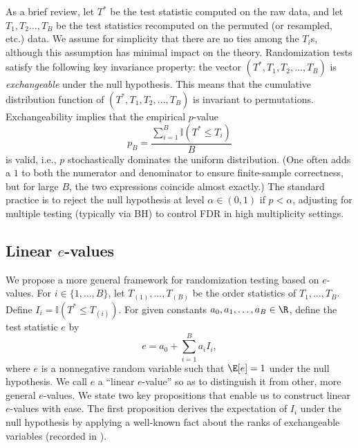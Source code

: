 \documentclass[12pt]{article}
\begin{document}
As a brief review, let $T^*$ be the test statistic computed on the raw data, and let $T_1, T_2 \dots, T_B$ be the test statistics recomputed on the permuted (or resampled, etc.) data. We assume for simplicity that there are no ties among the $T_i$s, although this assumption has minimal impact on the theory.  Randomization tests satisfy the following key invariance property: the vector $(T^*, T_1, T_2, \dots, T_B)$ is \textit{exchangeable} under the null hypothesis. This means that the cumulative distribution function of $(T^*, T_1, T_2, \dots, T_B)$ is invariant to permutations. Exchangeability implies that the empirical $p$-value
$$ p_B =  \frac{\sum_{i=1}^B \mathbb{I}\left(T^* \leq T_i \right) }{B}$$ is valid, i.e., $p$ stochastically dominates the uniform distribution. (One often adds a $1$ to both the numerator and denominator to ensure finite-sample correctness, but for large $B$, the two expressions coincide almost exactly.) The standard practice is to reject the null hypothesis at level $\alpha \in (0,1)$ if $p < \alpha$, adjusting for multiple testing (typically via BH) to control FDR in high multiplicity settings.

\subsection*{Linear $e$-values}

We propose a more general framework for randomization testing based on $e$-values. For $i \in \{1, \dots, B\}$, let $T_{(1)}, \dots, T_{(B)}$ be the order statistics of  $T_1, \dots, T_B$. Define $I_i = \mathbb{I}(T^* \leq T_{(i)}).$ For given constants $a_0, a_1, \dots, a_B \in \R$, define the test statistic $e$ by 
\begin{equation}\label{lin_e_def}
e = a_0 + \sum_{i=1}^B a_i I_i,
\end{equation}
 where $e$ is a nonnegative random variable such that $\E[e] = 1$ under the null hypothesis. We call $e$ a ``linear $e$-value'' so as to distinguish it from other, more general $e$-values. We state two key propositions that enable us to construct linear $e$-values with ease. The first proposition derives the expectation of $I_i$ under the null hypothesis by applying a well-known fact about the ranks of exchangeable variables (recorded in \cite{Kuchibhotla2020}).
\end{document}
